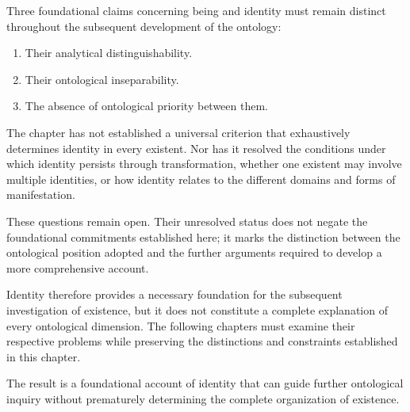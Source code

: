 Three foundational claims concerning being and identity
must remain distinct throughout the subsequent
development of the ontology:

\begin{enumerate}
    \item Their analytical distinguishability.
    \item Their ontological inseparability.
    \item The absence of ontological priority between them.
\end{enumerate}

The chapter has not established a universal criterion
that exhaustively determines identity in every existent.
Nor has it resolved the conditions under which identity
persists through transformation, whether one existent
may involve multiple identities, or how identity relates
to the different domains and forms of manifestation.

These questions remain open. Their unresolved status
does not negate the foundational commitments established
here; it marks the distinction between the ontological
position adopted and the further arguments required
to develop a more comprehensive account.

Identity therefore provides a necessary foundation
for the subsequent investigation of existence, but
it does not constitute a complete explanation of every
ontological dimension. The following chapters must
examine their respective problems while preserving
the distinctions and constraints established in this
chapter.

The result is a foundational account of identity that
can guide further ontological inquiry without prematurely
determining the complete organization of existence.


